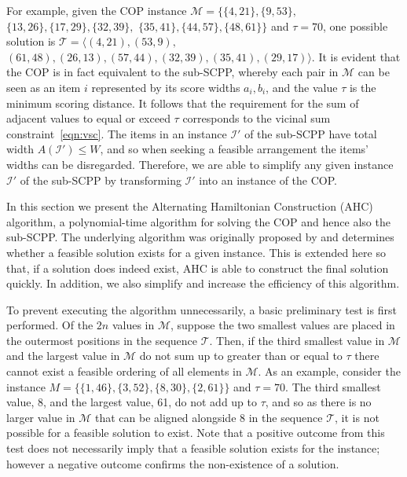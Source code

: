 \documentclass[a4paper,11pt,authoryear]{elsarticle}
\begin{document}
\noindent For example, given the COP instance $\mathcal{M} = \{\{4,21\}, \{9,53\},$ $\{13,26\}, \{17,29\}, \{32,39\},$ $\{35,41\}, \{44,57\}, \{48,61\} \}$ and $\tau = 70$, one possible solution is $\mathcal{T} = \langle(4,21), (53,9),$ $(61,48), (26,13), (57,44), (32,39), (35,41), (29,17)\rangle$. It is evident that the COP is in fact equivalent to the sub-SCPP, whereby each pair in $\mathcal{M}$ can be seen as an item $i$ represented by its score widths $a_i, b_i$, and the value $\tau$ is the minimum scoring distance. It follows that the requirement for the sum of adjacent values to equal or exceed $\tau$ corresponds to the vicinal sum constraint~\eqref{eqn:vsc}. The items in an instance $\mathcal{I}'$ of the sub-SCPP have total width $A(\mathcal{I}') \leq W$, and so when seeking a feasible arrangement the items' widths can be disregarded. Therefore, we are able to simplify any given instance $\mathcal{I}'$ of the sub-SCPP by transforming $\mathcal{I}'$ into an instance of the COP.

In this section we present the Alternating Hamiltonian Construction (AHC) algorithm, a polynomial-time algorithm for solving the COP and hence also the sub-SCPP. The underlying algorithm was originally proposed by \cite{becker2010} and determines whether a feasible solution exists for a given instance. This is extended here so that, if a solution does indeed exist, AHC is able to construct the final solution quickly. In addition, we also simplify and increase the efficiency of this algorithm.

To prevent executing the algorithm unnecessarily, a basic preliminary test is first performed. Of the $2n$ values in $\mathcal{M}$, suppose the two smallest values are placed in the outermost positions in the sequence $\mathcal{T}$. Then, if the third smallest value in $\mathcal{M}$ and the largest value in $\mathcal{M}$ do not sum up to greater than or equal to $\tau$ there cannot exist a feasible ordering of all elements in $\mathcal{M}$. As an example, consider the instance $M = \{\{1,46\}, \{3,52\}, \{8,30\}, \{2, 61\}\}$ and $\tau =70$. The third smallest value, 8, and the largest value, 61, do not add up to $\tau$, and so as there is no larger value in $\mathcal{M}$ that can be aligned alongside 8 in the sequence $\mathcal{T}$, it is not possible for a feasible solution to exist. Note that a positive outcome from this test does not necessarily imply that a feasible solution exists for the instance; however a negative outcome confirms the non-existence of a solution.
\end{document}
